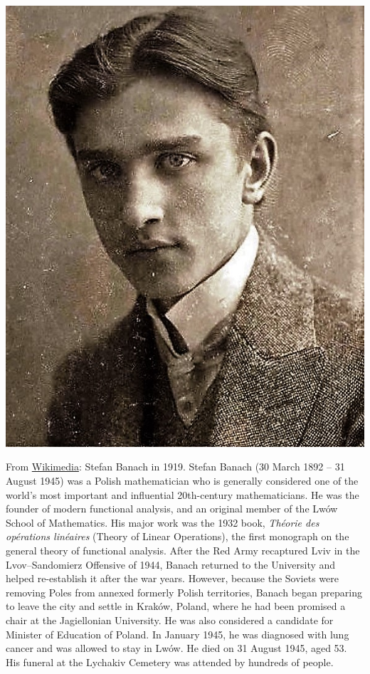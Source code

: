 \documentclass[../main.tex]{subfiles}
\begin{document}
\begin{marginfigure}
	\includegraphics[width=1\linewidth]{images/Stefan_Banach.jpg}
	\caption[Photo of Stefan Banach in 1919]{From \href{https://commons.wikimedia.org/wiki/File:Stefan_Banach.jpg?uselang=it}{Wikimedia}: Stefan Banach in 1919. Stefan Banach (30 March 1892 – 31 August 1945) was a Polish mathematician who is generally considered one of the world's most important and influential 20th-century mathematicians. He was the founder of modern functional analysis, and an original member of the Lwów School of Mathematics. His major work was the 1932 book, \textit{Théorie des opérations linéaires} (Theory of Linear Operations), the first monograph on the general theory of functional analysis. After the Red Army recaptured Lviv in the Lvov–Sandomierz Offensive of 1944, Banach returned to the University and helped re-establish it after the war years. However, because the Soviets were removing Poles from annexed formerly Polish territories, Banach began preparing to leave the city and settle in Kraków, Poland, where he had been promised a chair at the Jagiellonian University. He was also considered a candidate for Minister of Education of Poland. In January 1945, he was diagnosed with lung cancer and was allowed to stay in Lwów. He died on 31 August 1945, aged 53. His funeral at the Lychakiv Cemetery was attended by hundreds of people.}
\end{marginfigure}
\end{document}
